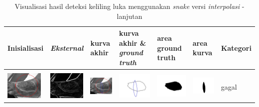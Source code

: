 \begin{table}[H]
	\centering
	\caption{Visualisasi hasil deteksi keliling luka menggunakan \emph{snake} versi \emph{interpolasi} - lanjutan}
	\label{tabel_hasil_12_interp}
	\begin{tabular}{|m{0.7in}|m{0.7in}|m{0.7in}|m{0.7in}|m{0.7in}|m{0.7in}|m{0.7in}|}
		\hline
		\textbf{Inisialisasi} & \textbf{\emph{Eksternal}} & \textbf{kurva akhir} & \textbf{kurva akhir \& \emph{ground truth}}& \textbf{area ground truth} & \textbf{area kurva} & \textbf{Kategori} \\
		\hline
		
		&  &  & & & &  \\
		\includegraphics[width=0.7in]{dataset/dataset_3/luka_merah/ready/11_interp_init.jpg}&
		\includegraphics[width=0.7in]{dataset/dataset_3/luka_merah/ready/11_interp_ext.jpg}&
		\includegraphics[width=0.7in]{dataset/dataset_3/luka_merah/ready/11_interp_result.jpg}&
		\includegraphics[width=0.7in]{dataset/dataset_3/luka_merah/ready/11_gt_r.jpg}&
		\includegraphics[width=0.7in]{dataset/dataset_3/luka_merah/ready/11_r.jpg}&
		\includegraphics[width=0.7in]{dataset/dataset_3/luka_merah/ready/11_interp_r.jpg}&
		gagal\\
		\hline
		

\end{tabular}
\end{table}
